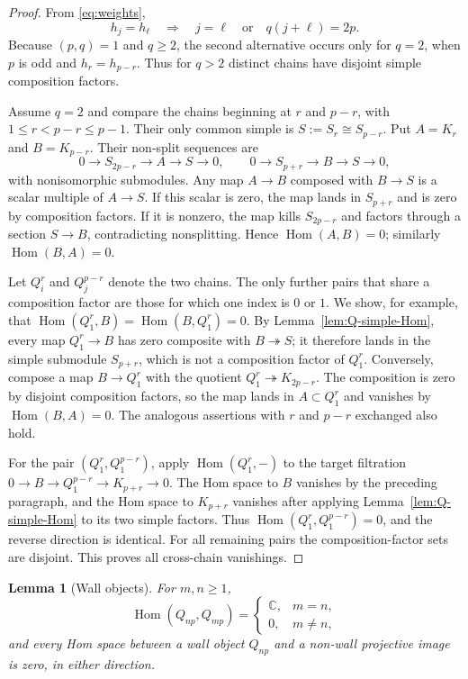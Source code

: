 \documentclass[12pt,leqno]{amsart}
\numberwithin{equation}{section}
\newtheorem{lem}[thm]{Lemma}
\newcommand{\Hom}{\operatorname{Hom}}
\def\C{\mathbb{C}}
\begin{document}
\begin{proof}
From \eqref{eq:weights},
\begin{equation}\label{eq:weight-equality}
 h_j=h_\ell
 \quad\Longrightarrow\quad
 j=\ell\quad\text{or}\quad q(j+\ell)=2p.
\end{equation}
Because $(p,q)=1$ and $q\geq2$, the second alternative occurs only for
$q=2$, when $p$ is odd and $h_r=h_{p-r}$.  Thus for $q>2$ distinct chains
have disjoint simple composition factors.

Assume $q=2$ and compare the chains beginning at $r$ and $p-r$, with
$1\leq r<p-r\leq p-1$.  Their only common simple is
$S:=S_r\cong S_{p-r}$.  Put $A=K_r$ and $B=K_{p-r}$.  Their non-split
sequences are
\[
 0\to S_{2p-r}\to A\to S\to0,
 \qquad
 0\to S_{p+r}\to B\to S\to0,
\]
with nonisomorphic submodules.  Any map $A\to B$ composed with $B\to S$
is a scalar multiple of $A\to S$.  If this scalar is zero, the map lands in
$S_{p+r}$ and is zero by composition factors.  If it is nonzero, the map
kills $S_{2p-r}$ and factors through a section $S\to B$, contradicting
nonsplitting.  Hence $\Hom(A,B)=0$; similarly $\Hom(B,A)=0$.

Let $Q^r_i$ and $Q^{p-r}_j$ denote the two chains.  The only further pairs
that share a composition factor are those for which one index is $0$ or
$1$.  We show, for example, that
$\Hom(Q^r_1,B)=\Hom(B,Q^r_1)=0$.  By
Lemma~\ref{lem:Q-simple-Hom}, every map $Q^r_1\to B$ has zero composite
with $B\twoheadrightarrow S$; it therefore lands in the simple submodule
$S_{p+r}$, which is not a composition factor of $Q^r_1$.  Conversely,
compose a map $B\to Q^r_1$ with the quotient
$Q^r_1\twoheadrightarrow K_{2p-r}$.  The composition is zero by disjoint
composition factors, so the map lands in $A\subset Q^r_1$ and vanishes by
$\Hom(B,A)=0$.  The analogous assertions with $r$ and $p-r$ exchanged also
hold.

For the pair $(Q^r_1,Q^{p-r}_1)$, apply
$\Hom(Q^r_1,-)$ to the target filtration
$0\to B\to Q^{p-r}_1\to K_{p+r}\to0$.  The Hom space to $B$ vanishes by
the preceding paragraph, and the Hom space to $K_{p+r}$ vanishes after
applying Lemma~\ref{lem:Q-simple-Hom} to its two simple factors.  Thus
$\Hom(Q^r_1,Q^{p-r}_1)=0$, and the reverse direction is identical.  For all
remaining pairs the composition-factor sets are disjoint.  This proves all
cross-chain vanishings.
\end{proof}

\begin{lem}[Wall objects]\label{lem:wall-Hom}
For $m,n\geq1$,
\[
 \Hom(Q_{np},Q_{mp})=
 \begin{cases}
  \C,&m=n,\\
  0,&m\neq n,
 \end{cases}
\]
and every Hom space between a wall object $Q_{np}$ and a non-wall
projective image is zero, in either direction.
\end{lem}
\end{document}
